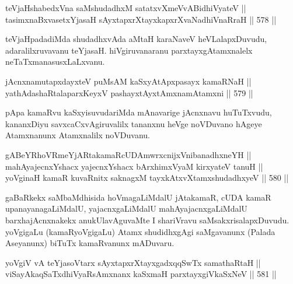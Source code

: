 
\begin{shl}
teVjaHshabedxVna saMshudadhxM satatxvXmeVvABidhiVyateV || \\
tasimxnaBxvasetxYjasaH sAyxtapxrXtayxkapxrXvaNadhiVnaRraH \hfill || 578 ||  
\end{shl}

\begin{artha}
teVjaHpadadiMda shudadhxvAda aMtaH karaNaveV heVLalapxDuvudu,
adaralilxruvavanu teYjasaH. hiVgiruvanaranu parxtayxgAtamxnalelx
neTaTxmanasusxLaLxvanu.
\end{artha}


\begin{shl}
jAcnxnamutapxdayxteV puMsAM kaSxyAtApxpasayx kamaRNaH || \\
yathA\s \s dashaRtalaparxKeyxV pashayxtAyxtAmxnamAtamxni \hfill || 579 ||  
\end{shl}

\begin{artha}
pApa kamaRvu kaSxyisuvudariMda mAnavarige jAcnxnavu huTuTxvudu,
kananxDiyu savxcaCxvAgiruvalilx tananxnu heVge noVDuvano hAgeye
Atamxnanunx Atamxnalilx noVDuvanu.
\end{artha}


\begin{shl}
gABeYRhoVRmeYjARtakamaRcUDAmwrxcnijxVnibanadhxneYH || \\
mahAyajecnxYshacx yajecnxYshacx bArxhimxVyaM kirxyateV tanuH || \\
yoVginaH kamaR kuvaRnitx saknagxM tayxkAtxvX\s \s tamxshudadhxyeV \hfill || 580 ||  
\end{shl}

\begin{artha}
gaBaRkekx saMbaMdhisida hoVmagaLiMdalU jAtakamaR, cUDA kamaR
upanayanagaLiMdalU, yajacnxgaLiMdalU mahAyajacnxgaLiMdalU
barxhajAcnxnakekx anukUlavAguvaMte I shariVravu
saMsakxrisalapxDuvudu. yoVgigaLu (kamaRyoVgigaLu) Atamx shudidhxgAgi
saMgavanunx (Palada Aseyanunx) biTuTx kamaRvanunx mADuvaru.
\end{artha}


\begin{shl}
yoVgiV vA teYjasoV\s tarx sAyxtapxrXtayxgadxqqSwTx samathaRtaH || \\
viSayAkaqSaTxdhiVyaRsAmxnanx kaSxmaH parxtayxgiVkaSxNeV \hfill || 581 ||  
\end{shl}

